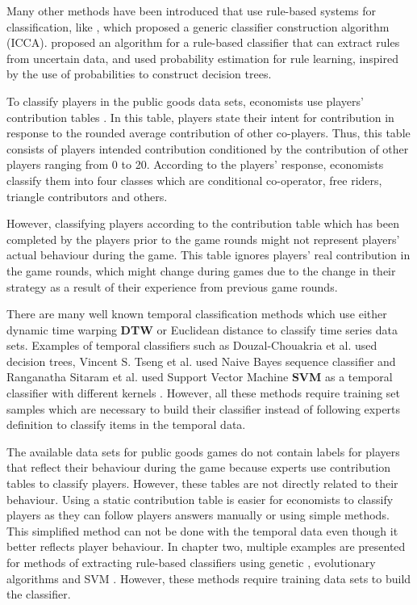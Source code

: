 Many other methods have been introduced that use rule-based systems for classification, like \cite{Giacometti2008}, which proposed a generic classifier construction algorithm (ICCA). \cite{Qin2009} proposed an algorithm for a rule-based classifier that can extract rules from uncertain data, and used probability estimation for rule learning, inspired by the use of probabilities to construct decision trees.

To classify players in the public goods data sets, economists use players' contribution tables \cite{Fischbacher2001}. In this table, players state their intent for contribution in response to the rounded average contribution of other co-players. Thus, this table consists of players intended contribution conditioned by the contribution of other players ranging from 0 to 20. According to the players' response, economists classify them into four classes which are conditional co-operator, free riders, triangle contributors and others.

However, classifying players according to the contribution table which has been completed by the players prior to the game rounds might not represent players' actual behaviour during the game. This table ignores players' real contribution in the game rounds, which might change during games due to the change in their strategy as a result of their experience from previous game rounds.

There are many well known temporal classification methods which use either dynamic time warping \textbf{DTW} \cite{Berndt1994} or Euclidean distance to classify time series data sets. Examples of temporal classifiers such as Douzal-Chouakria et al. \cite{Douzal-Chouakria2012} used decision trees, Vincent S. Tseng et al. used Naive Bayes sequence classifier \cite{Tseng2009} and Ranganatha Sitaram et al. used  Support Vector Machine \textbf{SVM} as a temporal classifier with different kernels \cite{Sitaram2007}. However, all these methods require training set samples which are necessary to build their classifier instead of following experts definition to classify items in the temporal data. 

The available data sets for public goods games do not contain labels for players that reflect their behaviour during the game because experts use contribution tables to classify players. However, these tables are not directly related to their behaviour. Using a static contribution table is easier for economists to classify players as they can follow players answers manually or using simple methods. This simplified method can not be done with the temporal data even though it better reflects player behaviour. In chapter two, multiple examples are presented for methods of extracting rule-based classifiers using genetic  \cite{McAulay1994}, evolutionary algorithms \cite{Orriols-Puig2009} and SVM \cite{Nunez2006}. However, these methods require training data sets to build the classifier. 
 

